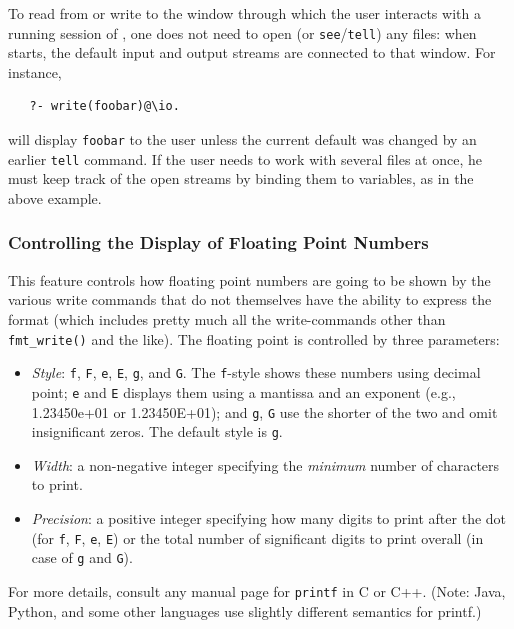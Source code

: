\documentclass[11pt]{article}
\newcommand{\ERGO}{\mbox{\smaller{\ensuremath{\cal{E}}\smaller{{\sc{RGO}}}}}\xspace}
\newcommand{\FLSYSTEM}{\ERGO}
\begin{document}
To read from or write to the window through which the user interacts with a running
session of \FLSYSTEM, one does not need to open (or
\texttt{see}/\texttt{tell}) any files: when \FLSYSTEM starts, the default
input and output streams are connected to that window. For instance,
\begin{verbatim}
   ?- write(foobar)@\io.
\end{verbatim}
will display \texttt{foobar}  to the user unless the current default was
changed by an earlier \texttt{tell}  command. If the user needs to work
with several files at once, he must keep track of the open streams by
binding them to variables, as in the above example.

\subsubsection{Controlling the Display of Floating Point Numbers}

This feature controls 
how floating point numbers are going to be shown by the various write
commands that do not themselves have the ability to express the format
(which includes pretty much all the write-commands other than
\texttt{fmt\_write()} and the like).
The floating point is controlled by three parameters:
\begin{itemize}
\item  \emph{Style}: \texttt{f}, \texttt{F}, \texttt{e}, \texttt{E},
  \texttt{g}, and \texttt{G}. The \texttt{f}-style shows these numbers
  using decimal point; \texttt{e} and \texttt{E} displays them using a
  mantissa and an exponent (e.g., 1.23450e+01 or 1.23450E+01); and
  \texttt{g}, \texttt{G} use the shorter of the two and omit insignificant
  zeros.  
  The default style is \texttt{g}.
\item \emph{Width}: a non-negative integer specifying the \emph{minimum}  number of
  characters to print.
\item \emph{Precision}: a positive integer specifying how many digits to print after
  the dot (for \texttt{f}, \texttt{F}, \texttt{e}, \texttt{E}) or the total
  number of significant digits to print overall (in case of \texttt{g} and
  \texttt{G}).
\end{itemize}
For more details, consult any manual page for \texttt{printf} in C or C++.
(Note: Java, Python, and some other languages use slightly different
semantics for printf.)
\end{document}
